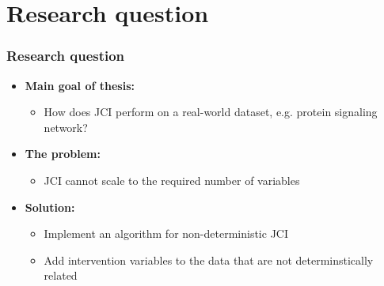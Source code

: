 \documentclass[10pt, compress]{beamer}
\begin{document}
    

\section{Research question}
\begin{frame}
    \frametitle{Research question}
    \begin{itemize}
        \item \textbf{Main goal of thesis:}
            \begin{itemize}[<+- | alert@+>]
                \item How does JCI perform on a real-world dataset,  e.g. protein signaling network? 
            \end{itemize}
    
        \item\textbf{The problem:}
            \begin{itemize}[<+- | alert@+>]
                \item JCI cannot scale to the required number of variables
            \end{itemize}
    
        \item\textbf{Solution:}
            \begin{itemize}[<+- | alert@+>]
                \item Implement an algorithm for non-deterministic JCI
                \item Add intervention variables to the data that are not determinstically related
            \end{itemize}
    \end{itemize}
\end{frame}

\end{document}
